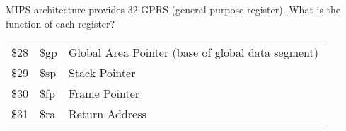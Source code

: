 \begin{exercise}[]{MIPS architecture provides 32 GPRS (general purpose register). What is the function of each register?  }
\begin{solution}
\begin{table}[htbp]
\begin{tabular}{@{}lll@{}}
    \$28                                           & \$gp                                           & Global Area Pointer (base of global data segment)                  \\
    \$29                                           & \$sp                                           & Stack Pointer                                                      \\
    \$30                                           & \$fp                                           & Frame Pointer                                                      \\
    \$31                                           & \$ra                                           & Return Address                                                     \\
    \bottomrule
    \end{tabular}
    \end{table}
  \end{solution}
  \label{ex3}
\end{exercise}
